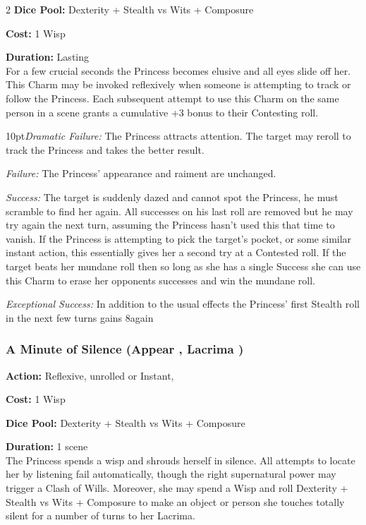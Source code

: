 \begin{multicols}{2}
\noindent \textbf{Dice Pool:} Dexterity + Stealth vs Wits + Composure

\noindent \textbf{Cost:} 1 Wisp 

\noindent \textbf{Duration:} Lasting \\

\noindent For a few crucial seconds the Princess becomes elusive and all eyes slide off her. This Charm may be invoked reflexively when someone is attempting to track or follow the Princess. Each subsequent attempt to use this Charm on the same person in a scene grants a cumulative +3 bonus to their Contesting roll.

\begin{myindentpar}{10pt}\emph{Dramatic Failure:} The Princess attracts attention. The target may reroll to track the Princess and takes the better result. 

    \emph{Failure:} The Princess' appearance and raiment are unchanged.

    \emph{Success:} The target is suddenly dazed and cannot spot the Princess, he must scramble to find her again. All successes on his last roll are removed but he may try again the next turn, assuming the Princess hasn't used this that time to vanish. If the Princess is attempting to pick the target's pocket, or some similar instant action, this essentially gives her a second try at a Contested roll. If the target beats her mundane roll then so long as she has a single Success she can use this Charm to erase her opponents successes and win the mundane roll. 

    \emph{Exceptional Success:} In addition to the usual effects the Princess' first Stealth roll in the next few turns gains 8again\end{myindentpar}

\subsubsection*{A Minute of Silence (Appear \textbullet, Lacrima \textbullet )}

\noindent \textbf{Action:} Reflexive, unrolled or Instant,

\noindent \textbf{Cost:} 1 Wisp 

\noindent \textbf{Dice Pool:} Dexterity + Stealth vs Wits + Composure

\noindent \textbf{Duration:} 1 scene \\

\noindent The Princess spends a wisp and shrouds herself in silence. All attempts to locate her by listening fail automatically, though the right supernatural power may trigger a Clash of Wills. Moreover, she may spend a Wisp and roll Dexterity + Stealth vs Wits + Composure to make an object or person she touches totally silent for a number of turns to her Lacrima. 


\end{multicols}
